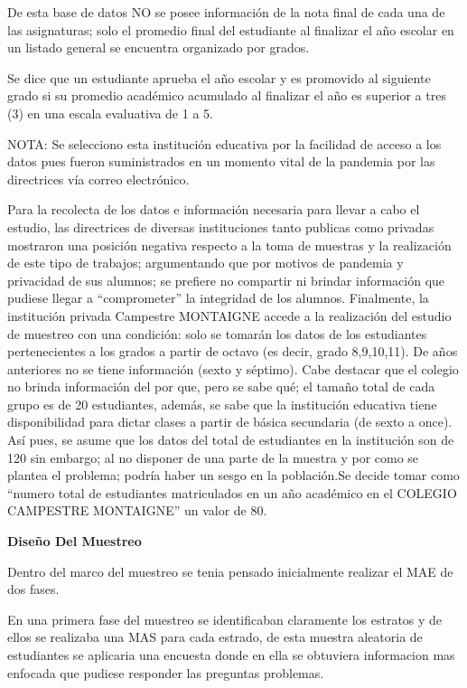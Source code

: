 \documentclass[
]{article}
\begin{document}
De esta base de datos NO se posee información de la nota final de cada
una de las asignaturas; solo el promedio final del estudiante al
finalizar el año escolar en un listado general se encuentra organizado
por grados.

Se dice que un estudiante aprueba el año escolar y es promovido al
siguiente grado si su promedio académico acumulado al finalizar el año
es superior a tres (3) en una escala evaluativa de 1 a 5.

NOTA: Se selecciono esta institución educativa por la facilidad de
acceso a los datos pues fueron suministrados en un momento vital de la
pandemia por las directrices vía correo electrónico.

Para la recolecta de los datos e información necesaria para llevar a
cabo el estudio, las directrices de diversas instituciones tanto
publicas como privadas mostraron una posición negativa respecto a la
toma de muestras y la realización de este tipo de trabajos; argumentando
que por motivos de pandemia y privacidad de sus alumnos; se prefiere no
compartir ni brindar información que pudiese llegar a ``comprometer'' la
integridad de los alumnos. Finalmente, la institución privada Campestre
MONTAIGNE accede a la realización del estudio de muestreo con una
condición: solo se tomarán los datos de los estudiantes pertenecientes a
los grados a partir de octavo (es decir, grado 8,9,10,11). De años
anteriores no se tiene información (sexto y séptimo). Cabe destacar que
el colegio no brinda información del por que, pero se sabe qué; el
tamaño total de cada grupo es de 20 estudiantes, además, se sabe que la
institución educativa tiene disponibilidad para dictar clases a partir
de básica secundaria (de sexto a once). Así pues, se asume que los datos
del total de estudiantes en la institución son de 120 sin embargo; al no
disponer de una parte de la muestra y por como se plantea el problema;
podría haber un sesgo en la población.Se decide tomar como ``numero
total de estudiantes matriculados en un año académico en el COLEGIO
CAMPESTRE MONTAIGNE'' un valor de 80.

\begin{center}
\textbf{Diseño Del Muestreo}
\end{center}

Dentro del marco del muestreo se tenia pensado inicialmente realizar el
MAE de dos fases.

En una primera fase del muestreo se identificaban claramente los
estratos y de ellos se realizaba una MAS para cada estrado, de esta
muestra aleatoria de estudiantes se aplicaria una encuesta donde en ella
se obtuviera informacion mas enfocada que pudiese responder las
preguntas problemas.
\end{document}
